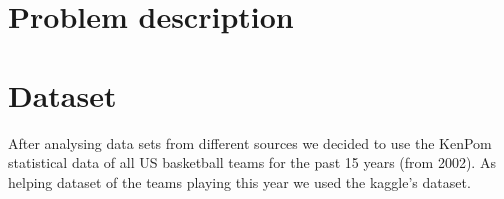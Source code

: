 \documentclass[
10pt, %
a4paper, %
oneside, %
headinclude,footinclude, %
BCOR5mm, %
]{scrartcl}
\begin{document}





\section{Problem description}
 


\section{Dataset}
After analysing data sets from different sources we decided to use the KenPom statistical data of all US basketball teams for the past 15 years (from 2002). As helping dataset of the teams playing this year we used the kaggle's dataset.
\end{document}
